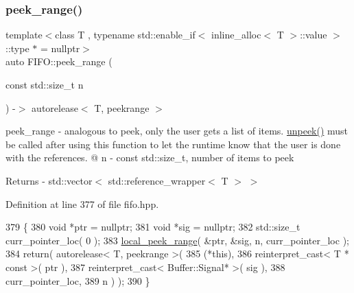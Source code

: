 \subsubsection{\texorpdfstring{peek\+\_\+range()}{peek\_range()}\hspace{0.1cm}{\footnotesize\ttfamily [1/2]}}
{\footnotesize\ttfamily template$<$class T , typename std\+::enable\+\_\+if$<$ inline\+\_\+alloc$<$ T $>$\+::value $>$\+::type $\ast$  = nullptr$>$ \\
auto F\+I\+F\+O\+::peek\+\_\+range (\begin{DoxyParamCaption}\item[{const std\+::size\+\_\+t}]{n }\end{DoxyParamCaption}) -\/$>$ autorelease$<$ T, peekrange $>$
   \hspace{0.3cm}{\ttfamily [inline]}}

peek\+\_\+range -\/ analogous to peek, only the user gets a list of items. \hyperlink{class_f_i_f_o_aa0cbb6c4a5b8783af38c6deb1a6f651e}{unpeek()} must be called after using this function to let the runtime know that the user is done with the references. @ n -\/ const std\+::size\+\_\+t, number of items to peek \begin{DoxyReturn}{Returns}
-\/ std\+::vector$<$ std\+::reference\+\_\+wrapper$<$ T $>$ $>$ 
\end{DoxyReturn}


Definition at line 377 of file fifo.\+hpp.


\begin{DoxyCode}
379    \{
380       \textcolor{keywordtype}{void} *ptr = \textcolor{keyword}{nullptr};
381       \textcolor{keywordtype}{void} *sig = \textcolor{keyword}{nullptr};
382       std::size\_t curr\_pointer\_loc( 0 );
383       \hyperlink{class_f_i_f_o_a8056adb06fadf2b7aae4d9858795be45}{local\_peek\_range}( &ptr, &sig, n, curr\_pointer\_loc );
384       \textcolor{keywordflow}{return}( autorelease< T, peekrange >( 
385          (*\textcolor{keyword}{this}),
386          reinterpret\_cast< T * const >( ptr ),
387          reinterpret\_cast< Buffer::Signal* >( sig ),
388          curr\_pointer\_loc,
389          n ) );
390    \}
\end{DoxyCode}
\hypertarget{class_f_i_f_o_ada716e83c59345f73295d3b6f720681f}{}\label{class_f_i_f_o_ada716e83c59345f73295d3b6f720681f} 
